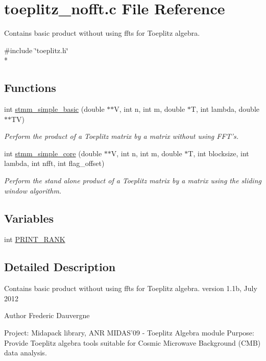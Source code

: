 \section{toeplitz\-\_\-nofft.\-c File Reference}
\label{toeplitz__nofft_8c}


Contains basic product without using ffts for Toeplitz algebra.  


{\ttfamily \#include \char`\"{}toeplitz.\-h\char`\"{}}\\*
\subsection*{Functions}
\begin{DoxyCompactItemize}
\item 
int \hyperlink{toeplitz__nofft_8c_af19f51ef406bebdb5e9400b6f9962077}{stmm\-\_\-simple\-\_\-basic} (double $\ast$$\ast$V, int n, int m, double $\ast$T, int lambda, double $\ast$$\ast$T\-V)
\begin{DoxyCompactList}\small\item\em Perform the product of a Toeplitz matrix by a matrix without using F\-F\-T's. \end{DoxyCompactList}\item 
int \hyperlink{toeplitz__nofft_8c_a516de87d3daf22f1a29ba390d5e57caa}{stmm\-\_\-simple\-\_\-core} (double $\ast$$\ast$V, int n, int m, double $\ast$T, int blocksize, int lambda, int nfft, int flag\-\_\-offset)
\begin{DoxyCompactList}\small\item\em Perform the stand alone product of a Toeplitz matrix by a matrix using the sliding window algorithm. \end{DoxyCompactList}\end{DoxyCompactItemize}
\subsection*{Variables}
\begin{DoxyCompactItemize}
\item 
int \hyperlink{toeplitz__nofft_8c_a300d52d9923297872ffb24962a0f0ce6}{P\-R\-I\-N\-T\-\_\-\-R\-A\-N\-K}
\end{DoxyCompactItemize}


\subsection{Detailed Description}
Contains basic product without using ffts for Toeplitz algebra. version 1.\-1b, July 2012 \begin{DoxyAuthor}{Author}
Frederic Dauvergne
\end{DoxyAuthor}
Project\-: Midapack library, A\-N\-R M\-I\-D\-A\-S'09 -\/ Toeplitz Algebra module Purpose\-: Provide Toeplitz algebra tools suitable for Cosmic Microwave Background (C\-M\-B) data analysis.


